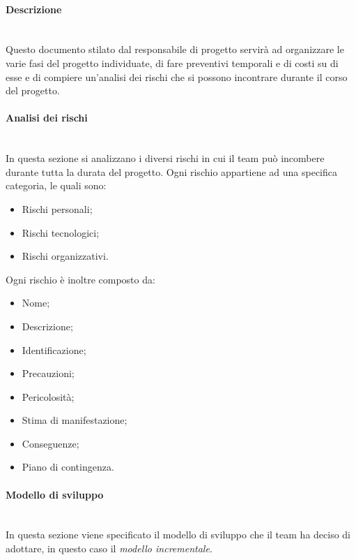 \paragraph {Descrizione}\mbox{}\\
Questo documento stilato dal responsabile di progetto servirà ad organizzare le varie fasi del progetto individuate, di fare preventivi temporali e di costi su di esse e di compiere un'analisi dei rischi che si possono incontrare durante il corso del progetto.
\paragraph {Analisi dei rischi}\mbox{}\\
In questa sezione si analizzano i diversi rischi in cui il team può incombere durante tutta la durata del progetto.
Ogni rischio appartiene ad una specifica categoria, le quali sono:
\begin{itemize}
	\item Rischi personali;
	\item Rischi tecnologici;
	\item Rischi organizzativi.
\end{itemize}
Ogni rischio è inoltre composto da:
\begin{itemize}
	\item Nome;
	\item Descrizione;
	\item Identificazione;
	\item Precauzioni;
	\item Pericolosità;
	\item Stima di manifestazione;
	\item Conseguenze;
	\item Piano di contingenza.
\end{itemize}
\paragraph {Modello di sviluppo}\mbox{}\\
In questa sezione viene specificato il modello di sviluppo che il team ha deciso di adottare, in questo caso il \textit{modello incrementale}.
